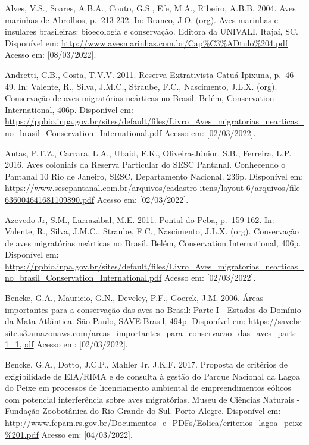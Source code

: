 \documentclass[
  oneside]{scrbook}
\begin{document}
Alves, V.S., Soares, A.B.A., Couto, G.S., Efe, M.A., Ribeiro, A.B.B. 2004. Aves marinhas de Abrolhos, p.~213-232. In: Branco, J.O. (org). Aves marinhas e insulares brasileiras: bioecologia e conservação. Editora da UNIVALI, Itajaí, SC. Disponível em: \url{http://www.avesmarinhas.com.br/Cap\%C3\%ADtulo\%204.pdf} Acesso em: {[}08/03/2022{]}.

Andretti, C.B., Costa, T.V.V. 2011. Reserva Extrativista Catuá-Ipixuna, p.~46-49. In: Valente, R., Silva, J.M.C., Straube, F.C., Nascimento, J.L.X. (org). Conservação de aves migratórias neárticas no Brasil. Belém, Conservation International, 406p. Disponível em: \url{https://ppbio.inpa.gov.br/sites/default/files/Livro_Aves_migratorias_nearticas_no_brasil_Conservation_International.pdf} Acesso em: {[}02/03/2022{]}.

Antas, P.T.Z., Carrara, L.A., Ubaid, F.K., Oliveira-Júnior, S.B., Ferreira, L.P. 2016. Aves coloniais da Reserva Particular do SESC Pantanal. Conhecendo o Pantanal 10 Rio de Janeiro, SESC, Departamento Nacional. 236p. Disponível em: \url{https://www.sescpantanal.com.br/arquivos/cadastro-itens/layout-6/arquivos/file-636004641681109890.pdf} Acesso em: {[}02/03/2022{]}.

Azevedo Jr, S.M., Larrazábal, M.E. 2011. Pontal do Peba, p.~159-162. In: Valente, R., Silva, J.M.C., Straube, F.C., Nascimento, J.L.X. (org). Conservação de aves migratórias neárticas no Brasil. Belém, Conservation International, 406p. Disponível em: \url{https://ppbio.inpa.gov.br/sites/default/files/Livro_Aves_migratorias_nearticas_no_brasil_Conservation_International.pdf} Acesso em: {[}02/03/2022{]}.

Bencke, G.A., Mauricio, G.N., Develey, P.F., Goerck, J.M. 2006. Áreas importantes para a conservação das aves no Brasil: Parte I - Estados do Domínio da Mata Atlântica. São Paulo, SAVE Brasil, 494p. Disponível em: \url{https://savebr-site.s3.amazonaws.com/areas_importantes_para_conservacao_das_aves_parte_1_1.pdf} Acesso em: {[}02/03/2022{]}.

Bencke, G.A., Dotto, J.C.P., Mahler Jr, J.K.F. 2017. Proposta de critérios de exigibilidade de EIA/RIMA e de consulta à gestão do Parque Nacional da Lagoa do Peixe em processos de licenciamento ambiental de empreendimentos eólicos com potencial interferência sobre aves migratórias. Museu de Ciências Naturais - Fundação Zoobotânica do Rio Grande do Sul. Porto Alegre. Disponível em: \url{http://www.fepam.rs.gov.br/Documentos_e_PDFs/Eolica/criterios_lagoa_peixe\%201.pdf} Acesso em: {[}04/03/2022{]}.
\end{document}

